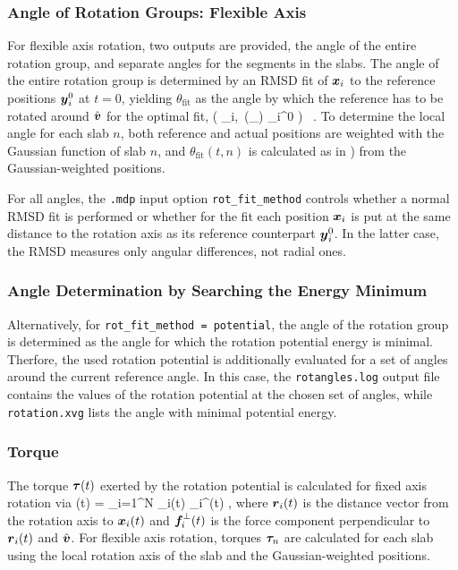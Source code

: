 \subsubsection*{Angle of Rotation Groups: Flexible Axis}
For flexible axis rotation, two outputs are provided, the angle of the
entire rotation group, and separate angles for the segments in the slabs.
The angle of the entire rotation group is determined by an RMSD fit 
of $\mbox{\boldmath ${x}$}_i$
to the reference positions $\mbox{\boldmath ${y}$}_i^0$ at $t=0$, yielding $\theta_\mathrm{fit}$
as the angle by which the reference has to be rotated around $\hat{\mbox{\boldmath ${v}$}}$ 
for the optimal fit,
\beq
{} \big( _i,\ \mathbf{\Omega}(\theta_)
_i^0 \big) \stackrel{!}{=}  \, .
\label{eqn:rmsdfit}
\eeq
To determine the local angle for each slab $n$, both reference and actual
positions are weighted with the Gaussian function of slab $n$, and 
$\theta_\mathrm{fit}(t,n)$ is calculated as in ) from the
Gaussian-weighted positions.

For all angles, the {\tt .mdp} input option {\tt rot\_fit\_method} controls
whether a normal RMSD fit is performed or whether for the fit each
position $\mbox{\boldmath ${x}$}_i$ is put at the same distance to the rotation axis as its
reference counterpart $\mbox{\boldmath ${y}$}_i^0$. In the latter case, the RMSD
measures only angular differences, not radial ones.


\subsubsection*{Angle Determination by Searching the Energy Minimum}
Alternatively, for {\tt rot\_fit\_method = potential}, the angle of the rotation 
group is determined as the angle for which the rotation potential energy is minimal.
Therfore, the used rotation potential is additionally evaluated for a set of angles 
around the current reference angle. In this case, the {\tt rotangles.log} output file
contains the values of the rotation potential at the chosen set of angles, while 
{\tt rotation.xvg} lists the angle with minimal potential energy.


\subsubsection*{Torque}
\label{torque}
The torque $\mbox{\boldmath ${\tau}$}(t)$ exerted by the rotation potential is calculated for fixed
axis rotation via
\beq
\ve{\tau}(t) = \sum_{i=1}^{N} _i(t) \times {}_{\!i}^\perp(t) ,
\label{eqn:torque}
\eeq
where $\mbox{\boldmath ${r}$}_i(t)$ is the distance vector from the rotation axis to
$\mbox{\boldmath ${x}$}_i(t)$ and $\mbox{\boldmath ${f}$}_{\!i}^\perp(t)$ is the force component
perpendicular to $\mbox{\boldmath ${r}$}_i(t)$ and $\hat{\mbox{\boldmath ${v}$}}$. For flexible axis
rotation, torques $\mbox{\boldmath ${\tau}$}_{\!n}$ are calculated for each slab using the
local rotation axis of the slab and the Gaussian-weighted positions.



